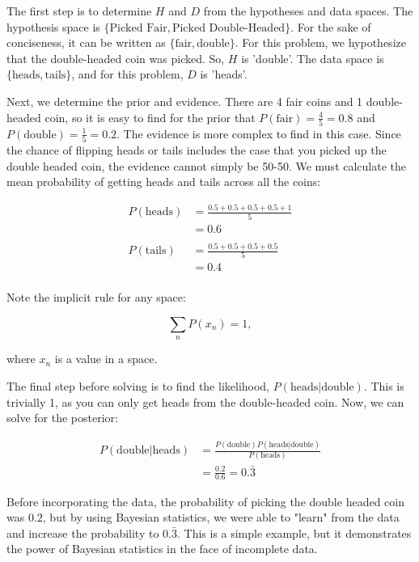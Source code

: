 \documentclass[preprint2,longauthor]{aastex631}
\begin{document}
The first step is to determine $H$ and $D$ from the hypotheses and data spaces. The hypothesis space is $\{\text{Picked Fair},\text{Picked Double-Headed}\}$. For the sake of conciseness, it can be written as $\{\text{fair},\text{double}\}$. For this problem, we hypothesize that the double-headed coin was picked. So, $H$ is 'double'. The data space is $\{\text{heads},\text{tails}\}$, and for this problem, $D$ is 'heads'.

Next, we determine the prior and evidence. There are 4 fair coins and 1 double-headed coin, so it is easy to find for the prior that $P(\text{fair}) = \frac{4}{5} = 0.8$ and $P(\text{double}) = \frac{1}{5} = 0.2$. The evidence is more complex to find in this case. Since the chance of flipping heads or tails includes the case that you picked up the double headed coin, the evidence cannot simply be 50-50. We must calculate the mean probability of getting heads and tails across all the coins:

\begin{align*}
  P(\text{heads}) &= \frac{0.5+0.5+0.5+0.5+1}{5} \\ &= 0.6 \\ \\
  P(\text{tails}) &= \frac{0.5+0.5+0.5+0.5}{5} \\ &= 0.4 \\
\end{align*}

Note the implicit rule for any space:

\begin{equation}
  \sum_n P(x_n) = 1,
\end{equation}

where $x_n$ is a value in a space.

The final step before solving is to find the likelihood, $P(\text{heads}|\text{double})$. This is trivially 1, as you can only get heads from the double-headed coin. Now, we can solve for the posterior:

\begin{align*}
  P(\text{double}|\text{heads}) &= \frac{P(\text{double})P(\text{heads}|\text{double})}{P(\text{heads})} \\
  &= \frac{0.2}{0.6} = \boxed{0.\bar{3}}
\end{align*}

Before incorporating the data, the probability of picking the double headed coin was $0.2$, but by using Bayesian statistics, we were able to "learn" from the data and increase the probability to $0.\bar{3}$. This is a simple example, but it demonstrates the power of Bayesian statistics in the face of incomplete data.
\end{document}
